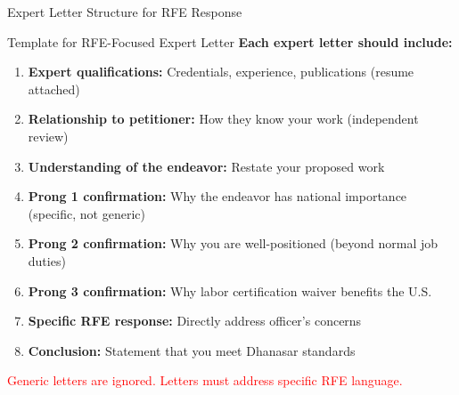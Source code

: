 \documentclass[11pt]{beamer}
\begin{document}
	\begin{frame}{Expert Letter Structure for RFE Response}
		\scriptsize
		\begin{block}{Template for RFE-Focused Expert Letter}
			\textbf{Each expert letter should include:}
			\begin{enumerate}
				\item \textbf{Expert qualifications:} Credentials, experience, publications (resume attached)
				\item \textbf{Relationship to petitioner:} How they know your work (independent review)
				\item \textbf{Understanding of the endeavor:} Restate your proposed work
				\item \textbf{Prong 1 confirmation:} Why the endeavor has national importance (specific, not generic)
				\item \textbf{Prong 2 confirmation:} Why you are well-positioned (beyond normal job duties)
				\item \textbf{Prong 3 confirmation:} Why labor certification waiver benefits the U.S.
				\item \textbf{Specific RFE response:} Directly address officer's concerns
				\item \textbf{Conclusion:} Statement that you meet Dhanasar standards
			\end{enumerate}
			\textcolor{red}{Generic letters are ignored. Letters must address specific RFE language.}
		\end{block}
	\end{frame}
	
	
	
	
\end{document}
